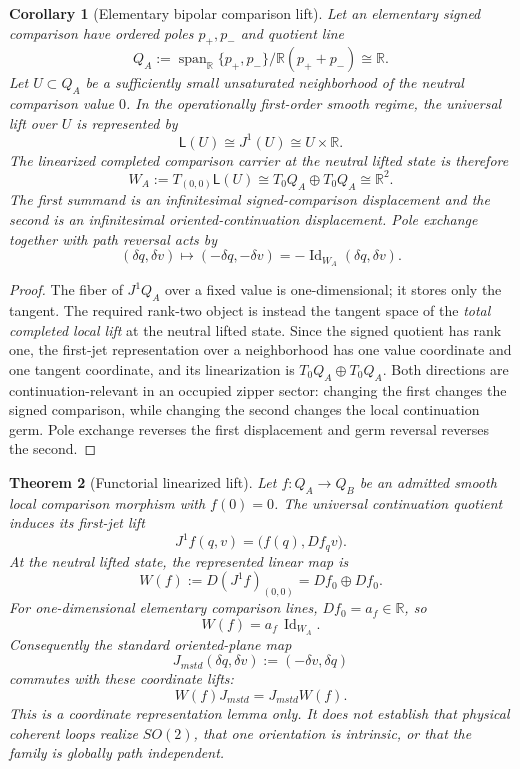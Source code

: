 \documentclass[11pt]{article}
\newtheorem{theorem}{Theorem}[section]
\newtheorem{corollary}[theorem]{Corollary}
\theoremstyle{remark}
\newcommand{\Id}{\operatorname{Id}}
\newcommand{\R}{\mathbb R}
\begin{document}
\begin{corollary}[Elementary bipolar comparison lift]\label{cor:bipolar-first-jet}
Let an elementary signed comparison have ordered poles $p_+,p_-$ and quotient line
\[
        Q_A:=\operatorname{span}_{\R}\{p_+,p_-\}/\R(p_++p_-)
        \cong\R.
\]
Let $U\subset Q_A$ be a sufficiently small unsaturated neighborhood of the neutral comparison value $0$.  In the operationally first-order smooth regime, the universal lift over $U$ is represented by
\[
        \mathsf L(U)\cong J^1(U)\cong U\times\R.
\]
The linearized completed comparison carrier at the neutral lifted state is therefore
\[
        W_A:=T_{(0,0)}\mathsf L(U)
        \cong T_0Q_A\oplus T_0Q_A
        \cong\R^2.
\]
The first summand is an infinitesimal signed-comparison displacement and the second is an infinitesimal oriented-continuation displacement.  Pole exchange together with path reversal acts by
\[
        (\delta q,\delta v)\longmapsto(-\delta q,-\delta v)
        =-\Id_{W_A}(\delta q,\delta v).
\]
\end{corollary}

\begin{proof}
The fiber of $J^1Q_A$ over a fixed value is one-dimensional; it stores only the tangent.  The required rank-two object is instead the tangent space of the \emph{total completed local lift} at the neutral lifted state.  Since the signed quotient has rank one, the first-jet representation over a neighborhood has one value coordinate and one tangent coordinate, and its linearization is
$T_0Q_A\oplus T_0Q_A$.  Both directions are continuation-relevant in an occupied zipper sector: changing the first changes the signed comparison, while changing the second changes the local continuation germ.  Pole exchange reverses the first displacement and germ reversal reverses the second.
\end{proof}

\begin{theorem}[Functorial linearized lift]\label{thm:functorial-linearized-lift}
Let $f:Q_A\to Q_B$ be an admitted smooth local comparison morphism with $f(0)=0$.  The universal continuation quotient induces its first-jet lift
\[
        J^1f(q,v)=\bigl(f(q),Df_qv\bigr).
\]
At the neutral lifted state, the represented linear map is
\[
        W(f):=D(J^1f)_{(0,0)}
        =Df_0\oplus Df_0.
\]
For one-dimensional elementary comparison lines, $Df_0=a_f\in\R$, so
\[
        W(f)=a_f\,\Id_{W_A}.
\]
Consequently the standard oriented-plane map
\[
        J_{
m std}(\delta q,\delta v):=(-\delta v,\delta q)
\]
commutes with these coordinate lifts:
\[
        W(f)J_{
m std}=J_{
m std}W(f).
\]
This is a coordinate representation lemma only.  It does not establish that physical coherent loops realize \(SO(2)\), that one orientation is intrinsic, or that the family is globally path independent.
\end{theorem}
\end{document}
